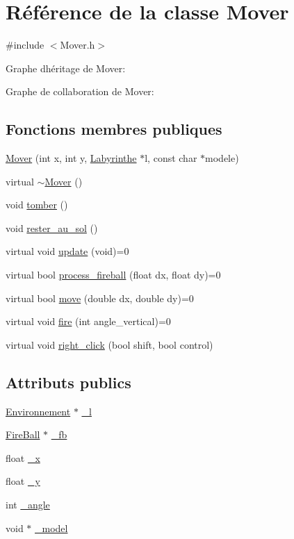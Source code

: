 \hypertarget{classMover}{}\section{Référence de la classe Mover}
\label{classMover}


{\ttfamily \#include $<$Mover.\+h$>$}



Graphe d\textquotesingle{}héritage de Mover\+:


Graphe de collaboration de Mover\+:
\subsection*{Fonctions membres publiques}
\begin{DoxyCompactItemize}
\item 
\hyperlink{classMover_a19c916be0b9f7d6beda92bb04aa338bb}{Mover} (int x, int y, \hyperlink{classLabyrinthe}{Labyrinthe} $\ast$l, const char $\ast$modele)
\item 
virtual \hyperlink{classMover_a906ab777eb5f6e49a85e3758aca9e913}{$\sim$\+Mover} ()
\item 
void \hyperlink{classMover_afc87cc38041a7ccc2a0129d33b0b2a6a}{tomber} ()
\item 
void \hyperlink{classMover_a05ac684f0ace96b717bb9aa016671e8e}{rester\+\_\+au\+\_\+sol} ()
\item 
virtual void \hyperlink{classMover_a77684ae3483af98c82c9488ef3e80f05}{update} (void)=0
\item 
virtual bool \hyperlink{classMover_a6d794056f34e2348d32ae4ff49326070}{process\+\_\+fireball} (float dx, float dy)=0
\item 
virtual bool \hyperlink{classMover_a2e1858e5c93ddaa85ff7b446ad403b79}{move} (double dx, double dy)=0
\item 
virtual void \hyperlink{classMover_a670fb72f8e496de3420b89c84def7418}{fire} (int angle\+\_\+vertical)=0
\item 
virtual void \hyperlink{classMover_ac32ed126c01d60c6df0090dd590b70b2}{right\+\_\+click} (bool shift, bool control)
\end{DoxyCompactItemize}
\subsection*{Attributs publics}
\begin{DoxyCompactItemize}
\item 
\hyperlink{classEnvironnement}{Environnement} $\ast$ \hyperlink{classMover_abb7d4bee1bba787f98e9c0b23624d914}{\+\_\+l}
\item 
\hyperlink{classFireBall}{Fire\+Ball} $\ast$ \hyperlink{classMover_a22a3132ed0579d2a155b1573a27604f3}{\+\_\+fb}
\item 
float \hyperlink{classMover_aaf143c6da9fb16aa10d041b73107d68b}{\+\_\+x}
\item 
float \hyperlink{classMover_ab0accef354ef4f78b61404fbc81c1ade}{\+\_\+y}
\item 
int \hyperlink{classMover_a76d84bfa5079c3a8ddf6d7f17e3898e2}{\+\_\+angle}
\item 
void $\ast$ \hyperlink{classMover_a92885841309ed1f2703fcfe7c56fcf42}{\+\_\+model}
\end{DoxyCompactItemize}
